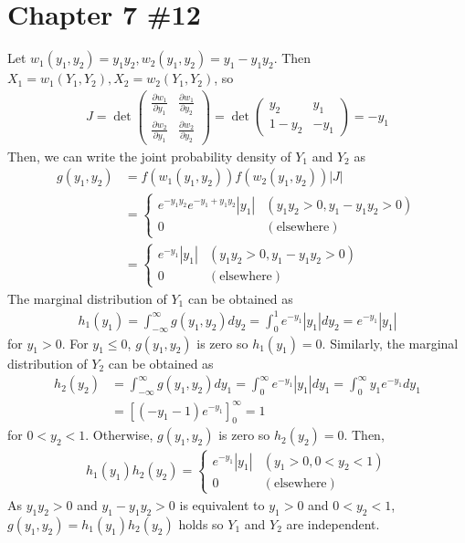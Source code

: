 \documentclass{scrartcl}
\begin{document}
\section{Chapter 7 \#12}
Let \(w_1(y_1, y_2) = y_1 y_2, w_2(y_1, y_2) = y_1 - y_1 y_2\). Then \(X_1 =
w_1(Y_1, Y_2), X_2 = w_2(Y_1, Y_2)\), so
\begin{align*}
  J
  = \det \begin{pmatrix}
    \frac{\partial w_1}{\partial y_1} & \frac{\partial w_1}{\partial y_2} \\
    \frac{\partial w_2}{\partial y_1} & \frac{\partial w_2}{\partial y_2}
  \end{pmatrix}
  = \det \begin{pmatrix}
    y_2 & y_1 \\
    1 - y_2 & -y_1
  \end{pmatrix}
  = -y_1
\end{align*}
Then, we can write the joint probability density of \(Y_1\) and \(Y_2\) as
\begin{align*}
  g(y_1, y_2)
  &= f(w_1(y_1, y_2)) f(w_2(y_1, y_2)) |J| \\
  &= \begin{cases}
    e^{-y_1 y_2} e^{-y_1 + y_1 y_2} |y_1| & (y_1 y_2 > 0, y_1 - y_1 y_2 > 0) \\
    0 & (\text{elsewhere})
  \end{cases} \\
  &= \begin{cases}
    e^{-y_1} |y_1| & (y_1 y_2 > 0, y_1 - y_1 y_2 > 0) \\
    0 & (\text{elsewhere})
  \end{cases}
\end{align*}
The marginal distribution of \(Y_1\) can be obtained as
\begin{align*}
  h_1(y_1)
  = \int^\infty_{-\infty} g(y_1, y_2) dy_2
  = \int^1_0 e^{-y_1} |y_1| dy_2
  = e^{-y_1} |y_1|
\end{align*}
for \(y_1 > 0\). For \(y_1 \le 0\), \(g(y_1, y_2)\) is zero so \(h_1(y_1) =
0\). Similarly, the marginal distribution of \(Y_2\) can be obtained as
\begin{align*}
  h_2(y_2)
  &= \int^\infty_{-\infty} g(y_1, y_2) dy_1
  = \int^\infty_0 e^{-y_1} |y_1| dy_1
  = \int^\infty_0 y_1 e^{-y_1} dy_1 \\
  &= \left[ (-y_1 - 1) e^{-y_1} \right]^\infty_0
  = 1
\end{align*}
for \(0 < y_2 < 1\). Otherwise, \(g(y_1, y_2)\) is zero so \(h_2(y_2) = 0\).
Then,
\begin{align*}
  h_1(y_1) h_2(y_2)
  = \begin{cases}
    e^{-y_1} |y_1| & (y_1 > 0, 0 < y_2 < 1) \\
    0 & (\text{elsewhere})
  \end{cases}
\end{align*}
As \(y_1 y_2 > 0\) and \(y_1 - y_1 y_2 > 0\) is equivalent to \(y_1 > 0\) and
\(0 < y_2 < 1\), \(g(y_1, y_2) = h_1(y_1) h_2(y_2)\) holds so \(Y_1\) and
\(Y_2\) are independent.
\end{document}
